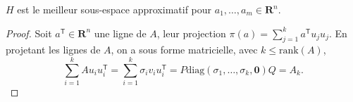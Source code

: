 \begin{remark}
$H$ est le meilleur sous-espace approximatif pour $a_{1},\dots,a_{m}\in \mathbf{R}^{n}$.
\end{remark}
\begin{proof}
Soit $a^{\mathsf{T}}\in \mathbf{R}^{n}$ une ligne de $A$, leur projection $\pi(a)=\sum_{j=1}^{k}a^{\mathsf{T}}u_{j}u_{j}$. En projetant les lignes de $A$, on a sous forme matricielle, avec $k\le \mathrm{rank}(A)$,  
$$
\sum_{i=1}^{k}Au_{i}u_{i}^{\mathsf{T}}=\sum_{i=1}^{k} \sigma _{i}v_{i}u_{i}^{\mathsf{T}} =P\mathrm{diag}(\sigma_{1},\dots,\sigma _{k},\boldsymbol{0})Q=A_{k}.
$$

\end{proof}